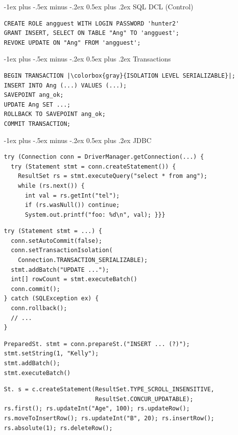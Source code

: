\documentclass[10pt,landscape,a4paper]{article}
\makeatletter
\renewcommand{\section}{\@startsection{section}{1}{0mm}%
                                {-1ex plus -.5ex minus -.2ex}%
                                {0.5ex plus .2ex}%
                                {\normalfont\large\bfseries}}
\makeatother
\begin{document}
\begin{multicols*}{3}
\section{SQL DCL (Control)}
\begin{verbatim}
CREATE ROLE angguest WITH LOGIN PASSWORD 'hunter2'
GRANT INSERT, SELECT ON TABLE "Ang" TO 'angguest';
REVOKE UPDATE ON "Ang" FROM 'angguest';
\end{verbatim}

\section{Transactions}
\begin{verbatim}
BEGIN TRANSACTION |\colorbox{gray}{ISOLATION LEVEL SERIALIZABLE}|;
INSERT INTO Ang (...) VALUES (...);
SAVEPOINT ang_ok;
UPDATE Ang SET ...;
ROLLBACK TO SAVEPOINT ang_ok;
COMMIT TRANSACTION;
\end{verbatim}


\vfill
\pagebreak

\section{JDBC}
\begin{verbatim}
try (Connection conn = DriverManager.getConnection(...) {
  try (Statement stmt = conn.createStatement()) {
    ResultSet rs = stmt.executeQuery("select * from ang");
    while (rs.next()) {
      int val = rs.getInt("tel");
      if (rs.wasNull()) continue;
      System.out.printf("foo: %d\n", val); }}}
\end{verbatim}

\begin{verbatim}
try (Statement stmt = ...) {
  conn.setAutoCommit(false);
  conn.setTransactionIsolation(
    Connection.TRANSACTION_SERIALIZABLE);
  stmt.addBatch("UPDATE ...");
  int[] rowCount = stmt.executeBatch()
  conn.commit();
} catch (SQLException ex) {
  conn.rollback();
  // ...
}
\end{verbatim}

\begin{verbatim}
PreparedSt. stmt = conn.prepareSt.("INSERT ... (?)");
stmt.setString(1, "Kelly");
stmt.addBatch();
stmt.executeBatch()
\end{verbatim}

\begin{verbatim}
St. s = c.createStatement(ResultSet.TYPE_SCROLL_INSENSITIVE,
                          ResultSet.CONCUR_UPDATABLE);
rs.first(); rs.updateInt("Age", 100); rs.updateRow();
rs.moveToInsertRow(); rs.updateInt("B", 20); rs.insertRow();
rs.absolute(1); rs.deleteRow();
\end{verbatim}


\end{multicols*}
\end{document}
